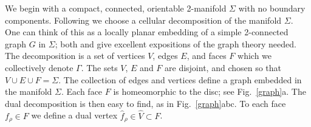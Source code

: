 \documentclass[11pt]{article}
\numberwithin{equation}{section}		%
\begin{document}
We begin with a compact, connected, orientable 2-manifold $\Sigma$ with no boundary components.
Following \cite{Mercat2001} we choose a cellular decomposition of the manifold $\Sigma$. One can think of this as a locally planar embedding of a simple 2-connected graph $G$ in $\Sigma$; both \cite{mohar2001} and \cite{gross1987} give excellent expositions of the graph theory needed.
The decomposition is a set of vertices $V$, edges $E$, and faces $F$ which we collectively denote $\Gamma$. 
The sets $V$, $E$ and $F$ are disjoint, and chosen so that $V \cup E \cup F = \Sigma$.
The collection of edges and vertices define a graph embedded in the manifold $\Sigma$. 
Each face $F$ is homeomorphic to the disc; see Fig.~\ref{graph}a. 
The dual decomposition is then easy to find, as in  
Fig.~\ref{graph}abc. %
To each face $f_\rho \in F$ we define a dual vertex $\widehat{f}_\rho \in \widehat{V} \subset F$. 
\end{document}
